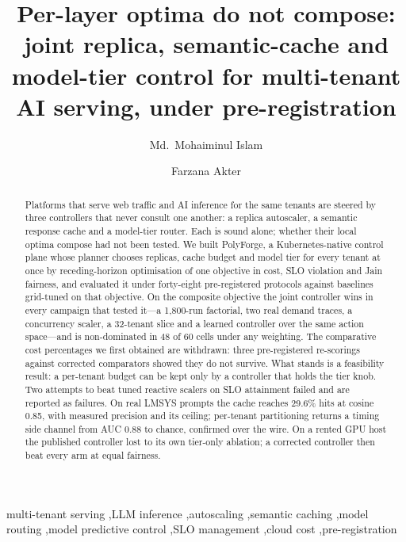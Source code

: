 \documentclass[preprint,review,12pt]{elsarticle}
\newcommand{\polyforge}{PolyForge}
\renewcommand{\_}{\ifmmode\origunderscore\else\textunderscore\allowbreak\fi}
\begin{document}
\begin{frontmatter}

\title{Per-layer optima do not compose: joint replica, semantic-cache and
model-tier control for multi-tenant AI serving, under pre-registration}

\author[ete]{Md.\ Mohaiminul Islam%
  }
\author[ete]{Farzana Akter}

\begin{abstract}
Platforms that serve web traffic and AI inference for the same tenants are
steered by three controllers that never consult one another: a replica
autoscaler, a semantic response cache and a model-tier router. Each is
sound alone; whether their local optima compose had not been tested. We
built \polyforge{}, a Kubernetes-native
control plane whose planner chooses replicas, cache budget and model tier
for every tenant at once by receding-horizon optimisation of one objective
in cost, SLO violation and Jain fairness, and evaluated it under
forty-eight pre-registered protocols against baselines grid-tuned on that
objective. On the composite objective the joint controller wins in every
campaign that tested it---a 1,800-run factorial, two real demand traces, a
concurrency scaler, a 32-tenant slice and a learned controller over the
same action space---and is non-dominated in 48 of 60 cells under any
weighting. The comparative cost percentages we first obtained are
withdrawn: three pre-registered re-scorings against corrected comparators
showed they do not survive. What stands is a feasibility result: a
per-tenant budget can be kept only by a controller that holds the tier
knob. Two attempts to beat tuned reactive scalers on SLO attainment failed
and are reported as failures. On real LMSYS prompts the cache reaches
29.6\% hits at cosine 0.85, with measured precision and its ceiling;
per-tenant partitioning returns a timing side channel from AUC 0.88 to
chance, confirmed over the wire. On a rented GPU host the published
controller lost to its own tier-only ablation; a corrected controller then
beat every arm at equal fairness.
\end{abstract}

\begin{keyword}
multi-tenant serving \sep LLM inference \sep autoscaling \sep semantic caching
\sep model routing \sep model predictive control \sep SLO management
\sep cloud cost \sep pre-registration
\end{keyword}

\end{frontmatter}
\end{document}
